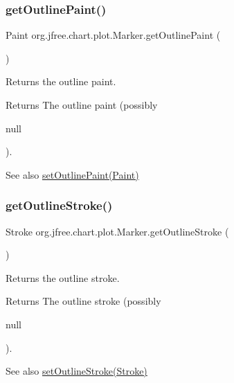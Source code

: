 \subsubsection{\texorpdfstring{get\+Outline\+Paint()}{getOutlinePaint()}}
{\footnotesize\ttfamily Paint org.\+jfree.\+chart.\+plot.\+Marker.\+get\+Outline\+Paint (\begin{DoxyParamCaption}{ }\end{DoxyParamCaption})}

Returns the outline paint.

\begin{DoxyReturn}{Returns}
The outline paint (possibly
\begin{DoxyCode}
null 
\end{DoxyCode}
 ).
\end{DoxyReturn}
\begin{DoxySeeAlso}{See also}
\mbox{\hyperlink{classorg_1_1jfree_1_1chart_1_1plot_1_1_marker_a1be6737e5fd64b728309cc4dcc08e9b3}{set\+Outline\+Paint(\+Paint)}} 
\end{DoxySeeAlso}
\mbox{\label{classorg_1_1jfree_1_1chart_1_1plot_1_1_marker_abb7e4be1e8ebb8f8a7144217f8abd8d9}} 
\subsubsection{\texorpdfstring{get\+Outline\+Stroke()}{getOutlineStroke()}}
{\footnotesize\ttfamily Stroke org.\+jfree.\+chart.\+plot.\+Marker.\+get\+Outline\+Stroke (\begin{DoxyParamCaption}{ }\end{DoxyParamCaption})}

Returns the outline stroke.

\begin{DoxyReturn}{Returns}
The outline stroke (possibly
\begin{DoxyCode}
null 
\end{DoxyCode}
 ).
\end{DoxyReturn}
\begin{DoxySeeAlso}{See also}
\mbox{\hyperlink{classorg_1_1jfree_1_1chart_1_1plot_1_1_marker_a6b74fd1bc29c013360dff5775f1ef8f3}{set\+Outline\+Stroke(\+Stroke)}} 
\end{DoxySeeAlso}
\mbox{\label{classorg_1_1jfree_1_1chart_1_1plot_1_1_marker_a65f07e12154446a3f6883ee55da268fd}} 
